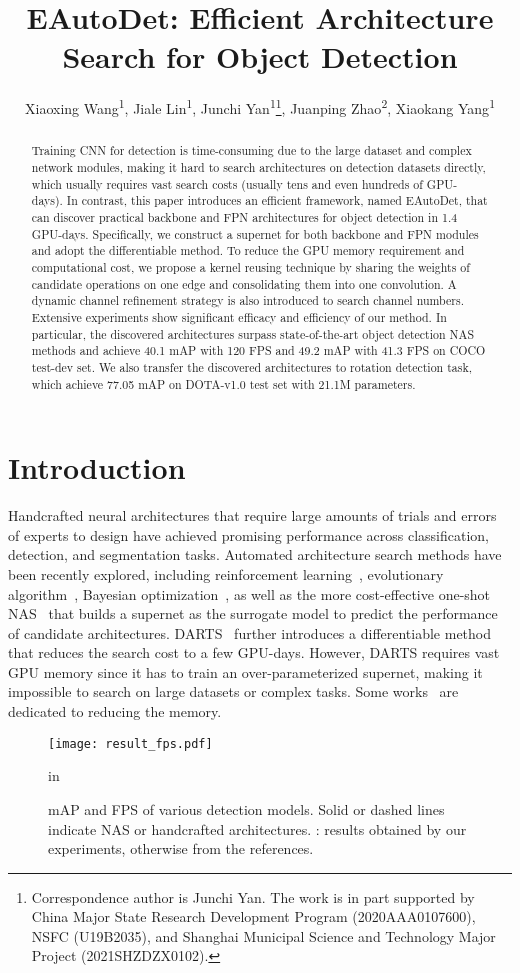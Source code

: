 \documentclass[letterpaper]{article} \usepackage{aaai22}  \usepackage{times}  \usepackage{helvet}  \usepackage{courier}  \usepackage[hyphens]{url}  \usepackage{graphicx} \urlstyle{rm} \def\UrlFont{\rm}  \usepackage{natbib}  \usepackage{caption} \DeclareCaptionStyle{ruled}{labelfont=normalfont,labelsep=colon,strut=off} \frenchspacing  \setlength{\pdfpagewidth}{8.5in}  \setlength{\pdfpageheight}{11in}
\title{EAutoDet: Efficient Architecture Search for Object Detection}
\author {
Xiaoxing Wang\textsuperscript{\rm 1}, 
    Jiale Lin\textsuperscript{\rm 1}, 
    Junchi Yan\textsuperscript{\rm 1}\thanks{Correspondence author is Junchi Yan. The work is in part supported by China Major State Research Development Program (2020AAA0107600), NSFC (U19B2035), and Shanghai Municipal Science and Technology Major Project (2021SHZDZX0102).}, 
    Juanping Zhao\textsuperscript{\rm 2}, 
    Xiaokang Yang\textsuperscript{\rm 1}
}
\begin{document}
\maketitle


\begin{abstract}
Training CNN for detection is time-consuming due to the large dataset and complex network modules, making it hard to search architectures on detection datasets directly, which usually requires vast search costs (usually tens and even hundreds of GPU-days). In contrast, this paper introduces an efficient framework, named EAutoDet, that can discover practical backbone and FPN architectures for object detection in 1.4 GPU-days. Specifically, we construct a supernet for both backbone and FPN modules and adopt the differentiable method. To reduce the GPU memory requirement and computational cost, we propose a kernel reusing technique by sharing the weights of candidate operations on one edge and consolidating them into one convolution. A dynamic channel refinement strategy is also introduced to search channel numbers. Extensive experiments show significant efficacy and efficiency of our method. In particular, the discovered architectures surpass state-of-the-art object detection NAS methods and achieve 40.1 mAP with 120 FPS and 49.2 mAP with 41.3 FPS on COCO test-dev set. We also transfer the discovered architectures to rotation detection task, which achieve 77.05 mAP on DOTA-v1.0 test set with 21.1M parameters. 
\end{abstract}


\section{Introduction}
Handcrafted neural architectures that require large amounts of trials and errors of experts to design have achieved promising performance across classification, detection, and segmentation tasks. Automated architecture search methods have been recently explored, including reinforcement learning~\cite{zoph2018learning}, evolutionary algorithm~\cite{real2019regularized}, Bayesian optimization~\cite{bananas}, as well as the more cost-effective one-shot NAS~\cite{bender2019understanding} that builds a supernet as the surrogate model to predict the performance of candidate architectures. DARTS~\cite{liu2018darts} further introduces a differentiable method that reduces the search cost to a few GPU-days. 
However, DARTS requires vast GPU memory since it has to train an over-parameterized supernet, making it impossible to search on large datasets or complex tasks.
Some works~\cite{wang2020mergenas,xu2019pc,dong2019searching} are dedicated to reducing the memory.
\begin{figure}[tb!]
\centering
    \texttt{[image: result\_fps.pdf]}
    \vspace{-8pt}
    \caption{mAP and FPS of various detection models. Solid or dashed lines indicate NAS or handcrafted architectures. : results obtained by our experiments, otherwise from the references.}
    \label{fig:result_fps}
     in
\end{figure}
\end{document}
